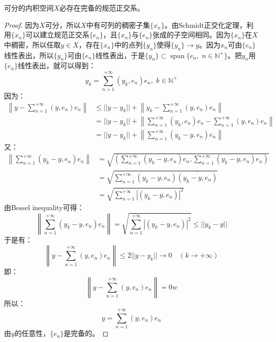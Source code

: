 \begin{theorem}
	可分的内积空间$X$必存在完备的规范正交系。
\end{theorem}
\begin{proof}
	因为$X$可分，所以$X$中有可列的稠密子集$\{x_n\}$。由Schmidt正交化定理，利用$\{x_n\}$可以建立规范正交系$\{e_n\}$，且$\{x_n\}$与$\{e_n\}$张成的子空间相同。因为$\{x_n\}$在$X$中稠密，所以任取$y\in X$，存在$\{x_n\}$中的点列$\{y_n\}$使得$\{y_n\}\to y$。因为$x_n$可由$\{e_n\}$线性表出，所以$\{y_n\}$可由$\{e_n\}$线性表出，于是$\{y_n\}\subset\operatorname{span}\{e_n,\;n\in\mathbb{N}^+\}$。把$y_n$用$\{e_n\}$线性表出，就可以得到：
	\begin{equation*}
		y_k=\sum_{n=1}^{+\infty}(y_k,e_n)e_n,\;k\in\mathbb{N}^+
	\end{equation*}
	因为：
	\begin{align*}
		\left\|y-\sum_{n=1}^{+\infty}(y,e_n)e_n\right\|
		&\leqslant||y-y_k||+\left\|y_k-\sum_{n=1}^{+\infty}(y,e_n)e_n\right\| \\
		&=||y-y_k||+\left\|\sum_{n=1}^{+\infty}(y_k,e_n)e_n-\sum_{n=1}^{+\infty}(y,e_n)e_n\right\| \\
		&=||y-y_k||+\left\|\sum_{n=1}^{+\infty}(y_k-y,e_n)e_n\right\|
	\end{align*}
	又：
	\begin{align*}
		\left\|\sum_{n=1}^{+\infty}(y_k-y,e_n)e_n\right\|
		&=\sqrt{\left(\sum_{n=1}^{+\infty}(y_k-y,e_n)e_n,\sum_{n=1}^{+\infty}(y_k-y,e_n)e_n\right)} \\
		&=\sqrt{\sum_{n=1}^{+\infty}(y_k-y,e_n)\overline{(y_k-y,e_n)}}  
		\\
		&=\sqrt{\sum_{n=1}^{+\infty}|(y_k-y,e_n)|^2}
	\end{align*}
	由Bessel inequality可得：
	\begin{equation*}
		\left\|\sum_{n=1}^{+\infty}(y_k-y,e_n)e_n\right\|
		=\sqrt{\sum_{n=1}^{+\infty}|(y_k-y,e_n)|^2}
		\leqslant||y_k-y||
	\end{equation*}
	于是有：
	\begin{equation*}
		\left\|y-\sum_{n=1}^{+\infty}(y,e_n)e_n\right\|
		\leqslant2||y-y_k||\to0\quad(k\to+\infty)
	\end{equation*}
	即：
	\begin{equation*}
		\left\|y-\sum_{n=1}^{+\infty}(y,e_n)e_n\right\|=0w
	\end{equation*}
	所以：
	\begin{equation*}
		y=\sum_{n=1}^{+\infty}(y,e_n)e_n
	\end{equation*}
	由$y$的任意性，$\{e_n\}$是完备的。
\end{proof}
